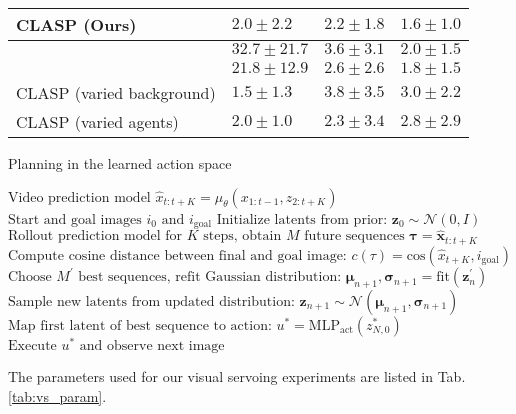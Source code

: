 \documentclass{article} %
\begin{document}
\begin{table}
\begin{tabular}{llll}
    CLASP (Ours)                       & $\bm{2.0}\pm \bm{2.2}$ & $\bm{2.2}\pm \bm{1.8}$ & $\bm{1.6}\pm \bm{1.0}$  \\
    \midrule
    \cite{agrawal2016learning}         & $32.7\pm 21.7$         & $3.6\pm 3.1$           & $2.0\pm 1.5$\\
    \cite{Oh:2015:AVP:2969442.2969560} & $21.8\pm 12.9$         & $2.6\pm 2.6$           & $1.8\pm 1.5$  \\
    \midrule
    CLASP (varied background)          & ${1.5}\pm {1.3}$       & $3.8 \pm 3.5$          & $3.0 \pm 2.2$\\
    CLASP (varied agents)              & $2.0\pm 1.0$           & $2.3\pm 3.4$           & $2.8\pm 2.9$  \\
    \bottomrule
  \end{tabular}
  \label{tab:servo_data}
\end{table}\begin{algorithm}[h]
	\caption{Planning in the learned action space} \label{alg:vs}
	\begin{algorithmic}[1]
		\Require $\text{Video prediction model } \hat{x}_{t:t+K} = \mu_\theta(x_{1:t-1}, z_{2:t+K})$
		\Require $\text{Start and goal images } i_0 \text{ and } i_{\text{goal}}$
          \State $\text{Initialize latents from prior: } \bm{z}_0 \sim \mathcal{N}(0,I)$
          	\State $\text{Rollout prediction model for }K\text{ steps, obtain }M\text{ future sequences } \bm{\tau} = \hat{\bm{x}}_{t:t+K}$
            \State $\text{Compute cosine distance between final and goal image: } c(\tau) = \text{cos}(\hat{x}_{t+K}, i_{\text{goal}})$
            \State $\text{Choose }M^\prime\text{ best sequences, refit Gaussian distribution: } \bm{\mu}_{n+1}, \bm{\sigma}_{n+1} = \text{fit}(\bm{z}_n^{\prime})$
            \State $\text{Sample new latents from updated distribution: }\bm{z}_{n+1} \sim \mathcal{N}(\bm{\mu}_{n+1}, \bm{\sigma}_{n+1})$
          \EndFor
          \State $\text{Map first latent of best sequence to action: } u^{\ast} = \text{MLP}_\text{act} (z_{N,0}^{\ast})$
          \State $\text{Execute }u^{\ast}\text{ and observe next image}$
		\EndFor
	\end{algorithmic}
\end{algorithm}

The parameters used for our visual servoing experiments are listed in Tab. \ref{tab:vs_param}.
\end{document}
